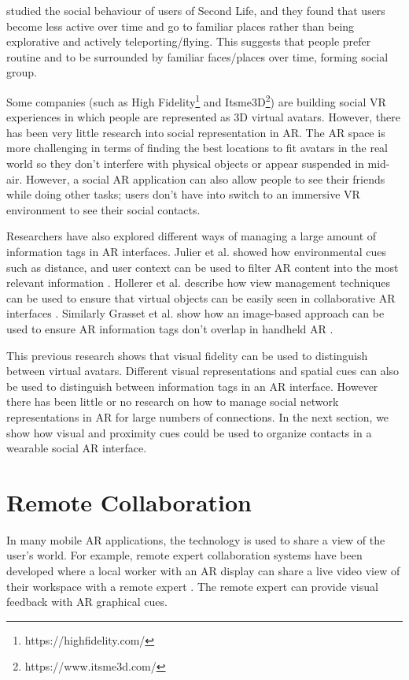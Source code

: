 \cite{Harris2009} studied the social behaviour of users of Second Life, and they found that users become less active over time and go to familiar places rather than being explorative and actively teleporting/flying. This suggests that people prefer routine and to be surrounded by familiar faces/places over time, forming social group.

Some companies (such as High Fidelity\footnote{https://highfidelity.com/} and Itsme3D\footnote{https://www.itsme3d.com/}) are building social VR experiences in which people are represented as 3D virtual avatars.
However, there has been very little research into social representation in AR. The AR space is more challenging in terms of finding the best locations to fit avatars in the real world so they don't interfere with physical objects or appear suspended in mid-air. However, a social  AR application can also allow people to see their friends while doing other tasks; users don't have into switch to an immersive VR environment to see their social contacts.

Researchers have also explored different ways of managing a large amount of information tags in AR interfaces.  Julier et al. showed how environmental cues such as distance, and user context can be used to filter AR content into the most relevant information \cite{Julier2002}. Hollerer et al. describe how view management techniques can be used to ensure that virtual objects can be easily seen in collaborative AR interfaces \cite{Hollerer2001}. Similarly Grasset et al. show how an image-based approach can be used to ensure AR information tags don't overlap in handheld AR \cite{Grasset2012}. 

This previous research shows that visual fidelity can be used to distinguish between virtual avatars. Different visual representations and spatial cues can also be used to distinguish between information tags in an AR interface. However there has been little or no research on how to manage social network representations in AR for large numbers of connections. In the next section, we show how visual and proximity cues could be used to organize contacts in a wearable social AR interface.

\section{Remote Collaboration}

In many mobile AR applications, the technology is used to share a view of the user's world. For example, remote expert collaboration systems have been developed where a local worker with an AR display can share a live video view of their workspace with a remote expert \cite{Billinghurst2002}. The remote expert can provide visual feedback with AR graphical cues.

